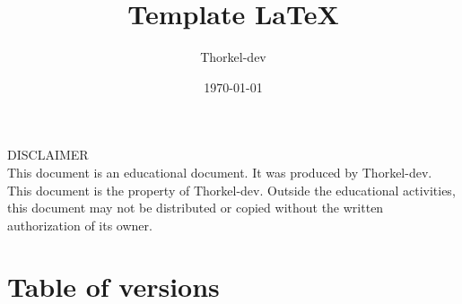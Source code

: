 \documentclass[a4paper,11pt,titlepage]{article}
\author{Thorkel-dev}        %
\title{Template \LaTeX}     %
\date{\normalsize\today}    %
\begin{document}
\maketitle

\BgThispage %
\vspace*{\fill}
\noindent
DISCLAIMER \\
This document is an educational document. It was produced by Thorkel-dev.
This document is the property of Thorkel-dev. Outside the educational activities, this document
may not be distributed or copied without the written authorization of its owner.
\vspace*{\fill}
\clearpage

\section*{Table of versions}
 \label{TableOfVersion} %
\clearpage

\tableofcontents %







\printglossary[type=\acronymtype] \label{acronyms}
\glsaddallunused %

\printglossary[] \label{domaindictionary} %
\glsaddallunused %

\listoffigures \label{TableOfFigure} %

\listoflistings \label{TableOfCode} %

\printbibliography[heading=bibnumbered, label=bibliography] %
\nocite{*} %

\clearpage
\null
\thispagestyle{empty}%
\addtocounter{page}{-1}%
\BgThispage
\end{document}
